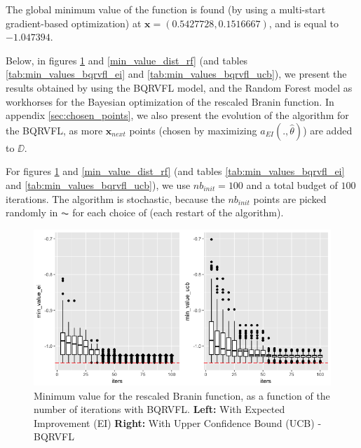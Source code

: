 \medskip

The global minimum value of the function is found (by using a multi-start gradient-based optimization) at $\textbf{x} = \left(0.5427728, 0.1516667\right)$, and is equal to $-1.047394$. 

Below, in figures \ref{min_value_dist_bqrvfl} and \ref{min_value_dist_rf} (and tables \ref{tab:min_values_bqrvfl_ei} and \ref{tab:min_values_bqrvfl_ucb}), we present the results obtained by using the BQRVFL model, and the Random Forest model as workhorses for the Bayesian optimization of the rescaled Branin function. In appendix \ref{sec:chosen_points}, we also present the evolution of the algorithm for the BQRVFL, as more $\textbf{x}_{next}$ points (chosen by maximizing $a_{EI}(., \hat{\theta})$) are added to $\DD$. 

For figures \ref{min_value_dist_bqrvfl} and \ref{min_value_dist_rf} (and tables \ref{tab:min_values_bqrvfl_ei} and \ref{tab:min_values_bqrvfl_ucb}), we use $nb_{init} = 100$ and a total budget of $100$ iterations. The algorithm is stochastic, because the $nb_{init}$ points are picked randomly in $\AC$ for each choice of  (each restart of the algorithm).  

\medskip

\begin{figure}[!htb]
\centering
\includegraphics[width=13cm]{gfx/chapter-bayesianrvfl/evol_iter_ei_ucb.png}
\caption{Minimum value for the rescaled Branin function, as a function of the number of iterations with BQRVFL. 
\textbf{Left:} With Expected Improvement (EI) \textbf{Right:} With Upper Confidence Bound (UCB) - BQRVFL}
\label{min_value_dist_bqrvfl}
\end{figure}

